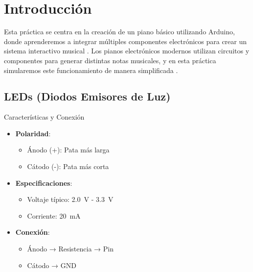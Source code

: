 
\setlength{\parindent}{0pt}
\setlength{\parskip}{6pt}

\section{Introducción}
Esta práctica se centra en la creación de un piano básico utilizando Arduino, donde aprenderemos a integrar múltiples componentes electrónicos para crear un sistema interactivo musical \citep{monk2017programming}. Los pianos electrónicos modernos utilizan circuitos y componentes para generar distintas notas musicales, y en esta práctica simularemos este funcionamiento de manera simplificada \citep{evans2011arduino}.


\subsection{LEDs (Diodos Emisores de Luz)}
\begin{componentBox}{Características y Conexión \citep{platt2014encyclopedia}}
	\begin{itemize}[leftmargin=*,itemsep=1pt,parsep=1pt]
		\item \textbf{Polaridad}:
		\begin{itemize}[itemsep=0pt,parsep=0pt]
			\item Ánodo (+): Pata más larga
			\item Cátodo (-): Pata más corta
		\end{itemize}
		\item \textbf{Especificaciones}:
		\begin{itemize}[itemsep=0pt,parsep=0pt]
			\item Voltaje típico: \SI{2.0}{\volt} - \SI{3.3}{\volt}
			\item Corriente: \SI{20}{\milli\ampere}
		\end{itemize}
		\item \textbf{Conexión}:
		\begin{itemize}[itemsep=0pt,parsep=0pt]
			\item Ánodo → Resistencia → Pin
			\item Cátodo → GND
		\end{itemize}
	\end{itemize}
\end{componentBox}


